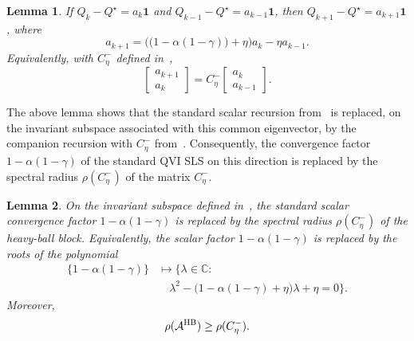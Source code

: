 \documentclass[letterpaper]{article}
\numberwithin{equation}{section}
\newtheorem{lemma}{Lemma}[section]
\begin{document}
\begin{lemma}
\label{lem:hb-common-eigenvector-recursion}
If $Q_k-Q^\star=a_k\mathbf{1}$ and
$Q_{k-1}-Q^\star=a_{k-1}\mathbf{1}$, then
$Q_{k+1}-Q^\star=a_{k+1}\mathbf{1}$, where
\begin{equation}
  a_{k+1}=
  \bigl(\bigl(1-\alpha(1-\gamma)\bigr)+\eta\bigr)a_k
  -\eta a_{k-1}.
  \label{eq:common-eigenvector-scalar-recursion}
\end{equation}
Equivalently, with $C_\eta^-$ defined in~,
\begin{equation*}
  \begin{bmatrix}a_{k+1}\\a_k\end{bmatrix}
  =C_\eta^-
  \begin{bmatrix}a_k\\a_{k-1}\end{bmatrix}.
\end{equation*}
\end{lemma}


The above lemma shows that the standard scalar recursion from~ is replaced, on the invariant subspace associated with this common eigenvector, by the companion recursion with $C_\eta^-$ from~. Consequently, the convergence factor $1-\alpha(1-\gamma)$ of the standard QVI SLS on this direction is replaced by the spectral radius $\rho(C_\eta^-)$ of the matrix $C_\eta^-$.
\begin{lemma}
\label{lem:hb-common-eigenvector-spectral-replacement}
On the invariant subspace defined in~, the standard scalar convergence factor $1-\alpha(1-\gamma)$ is replaced by the spectral radius $\rho(C_\eta^-)$ of the heavy-ball block. Equivalently, the scalar factor $1-\alpha(1-\gamma)$ is replaced by the roots of the polynomial
\begin{equation*}
\begin{aligned}
\bigl\{1-\alpha(1-\gamma)\bigr\}
&\longmapsto
\{\lambda\in\mathbb C:\\
&\quad
\lambda^2-\bigl(1-\alpha(1-\gamma)+\eta\bigr)\lambda+
\eta=0\}.
\end{aligned}
\end{equation*}
Moreover,
\begin{align*}
  \rho(\mathcal A^{\rm HB})\ge \rho(C_\eta^-).
\end{align*}
\end{lemma}
\end{document}
